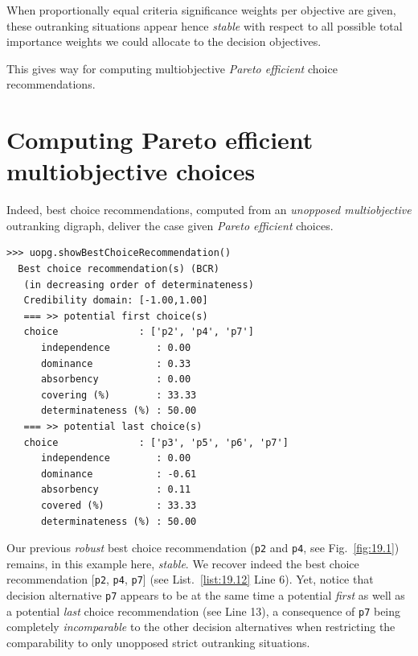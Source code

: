 When proportionally equal criteria significance weights per objective are given, these outranking situations appear hence \emph{stable} with respect to all possible total importance weights we could allocate to the decision objectives.

This gives way for computing multiobjective \emph{Pareto efficient} choice recommendations. 

\section{Computing Pareto efficient multiobjective choices}
\label{sec:19.6}

Indeed, best choice recommendations, computed from an \emph{unopposed multiobjective} outranking digraph, deliver the case given \emph{Pareto efficient} choices. 
\begin{lstlisting}[caption={Pareto efficient multiobjective choice},label=list:19.12]
>>> uopg.showBestChoiceRecommendation()
  Best choice recommendation(s) (BCR)
   (in decreasing order of determinateness)   
   Credibility domain: [-1.00,1.00]
   === >> potential first choice(s)
   choice              : ['p2', 'p4', 'p7']
      independence        : 0.00
      dominance           : 0.33
      absorbency          : 0.00
      covering (%)        : 33.33
      determinateness (%) : 50.00
   === >> potential last choice(s) 
   choice              : ['p3', 'p5', 'p6', 'p7']
      independence        : 0.00
      dominance           : -0.61
      absorbency          : 0.11
      covered (%)         : 33.33
      determinateness (%) : 50.00
\end{lstlisting}

Our previous \emph{robust} best choice recommendation (\texttt{p2} and \texttt{p4}, see Fig.~\vref{fig:19.1}) remains, in this example here, \emph{stable}. We recover indeed the best choice recommendation [\texttt{p2}, \texttt{p4}, \texttt{p7}] (see List.~\vref{list:19.12} Line 6). Yet, notice that decision alternative \texttt{p7} appears to be at the same time a potential \emph{first} as well as a potential \emph{last} choice recommendation (see Line 13), a consequence of \texttt{p7} being completely \emph{incomparable} to the other decision alternatives when restricting the comparability to only unopposed strict outranking situations. 

